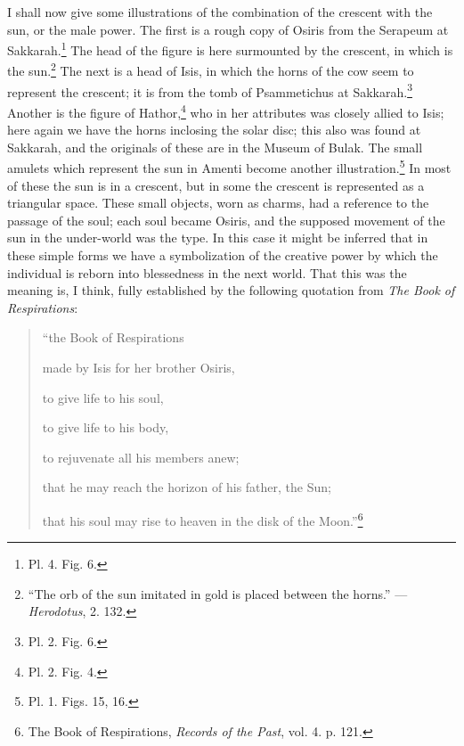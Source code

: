 \documentclass[a4paper, 11pt, oneside, english, landscape, twocolumn]{article}
\begin{document}
I shall now give some illustrations of the combination of the crescent with the sun, or the male power. The first is a rough copy of Osiris from the Serapeum at Sakkarah.\footnote{Pl. 4. Fig. 6.} The head of the figure is here surmounted by the crescent, in which is the sun.\footnote{``The orb of the sun imitated in gold is placed between the horns.'' --- \emph{Herodotus}, 2. 132.} The next is a head of Isis, in which the horns of the cow seem to represent the crescent; it is from the tomb of Psammetichus at Sakkarah.\footnote{Pl. 2. Fig. 6.} Another is the figure of Hathor,\footnote{Pl. 2. Fig. 4.} who in her attributes was closely allied to Isis; here again we have the horns inclosing the solar disc; this also was found at Sakkarah, and the originals of these are in the Museum of Bulak. The small amulets which represent the sun in Amenti become another illustration.\footnote{Pl. 1. Figs. 15, 16.} In most of these the sun is in a crescent, but in some the crescent is represented as a triangular space. These small objects, worn as charms, had a reference to the passage of the soul; each soul became Osiris, and the supposed movement of the sun in the under-world was the type. In this case it might be inferred that in these simple forms we have a symbolization of the creative power by which the individual is reborn into blessedness in the next world. That this was the meaning is, I think, fully established by the following quotation from \emph{The Book of Respirations}:
\begin{quotation}
``the Book of Respirations

made by Isis for her brother Osiris,

to give life to his soul,

to give life to his body,

to rejuvenate all his members anew;

that he may reach the horizon of his father, the Sun;

that his soul may rise to heaven in the disk of the Moon.''\footnote{The Book of Respirations, \emph{Records of the Past}, vol. 4. p. 121.}
\end{quotation}
\end{document}
